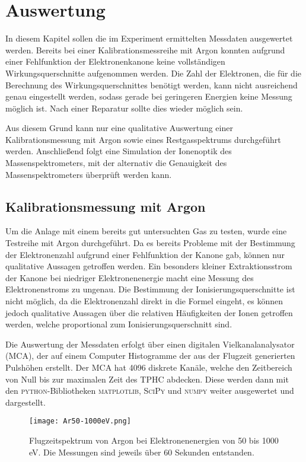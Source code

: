\chapter{Auswertung}
\label{chap:Auswertung}
In diesem Kapitel sollen die im Experiment ermittelten Messdaten ausgewertet werden. Bereits bei einer Kalibrationsmessreihe mit Argon konnten aufgrund einer Fehlfunktion der Elektronenkanone keine vollständigen Wirkungsquerschnitte aufgenommen werden. Die Zahl der Elektronen, die für die Berechnung des Wirkungsquerschnittes benötigt werden, kann nicht ausreichend genau eingestellt werden, sodass gerade bei geringeren Energien keine Messung möglich ist. Nach einer Reparatur sollte dies wieder möglich sein. 

Aus diesem Grund kann nur eine qualitative Auswertung einer Kalibrationsmessung mit Argon sowie eines Restgasspektrums durchgeführt werden. Anschließend folgt eine Simulation der Ionenoptik des Massenspektrometers, mit der alternativ die Genauigkeit des Massenspektrometers überprüft werden kann.

\section{Kalibrationsmessung mit Argon}
Um die Anlage mit einem bereits gut untersuchten Gas zu testen, wurde eine Testreihe mit Argon durchgeführt. Da es bereits Probleme mit der Bestimmung der Elektronenzahl aufgrund einer Fehlfunktion der Kanone gab, können nur qualitative Aussagen getroffen werden. Ein besonders kleiner Extraktionsstrom der Kanone bei niedriger Elektronenenergie macht eine Messung des Elektronenstroms zu ungenau. Die Bestimmung der Ionisierungsquerschnitte ist nicht möglich, da die Elektronenzahl direkt in die Formel eingeht, es können jedoch qualitative Aussagen über die relativen Häufigkeiten der Ionen getroffen werden, welche proportional zum Ionisierungsquerschnitt sind.

Die Auswertung der Messdaten erfolgt über einen digitalen Vielkanalanalysator (MCA), der auf einem Computer Histogramme der aus der Flugzeit generierten Pulshöhen erstellt. Der MCA hat 4096 diskrete Kanäle, welche den Zeitbereich von Null bis zur maximalen Zeit des TPHC abdecken. Diese werden dann mit den \textsc{python}-Bibliotheken \textsc{matplotlib}, \textsc{SciPy} und \textsc{numpy} weiter ausgewertet und dargestellt. 

\begin{figure}
    \centering
    \hspace{-1.6cm}\texttt{[image: Ar50-1000eV.png]}
    \caption[Flugzeitspektrum von Argon bei Elektronenenergien von 50 bis 1000 eV]{Flugzeitspektrum von Argon bei Elektronenenergien von 50 bis 1000 eV. Die Messungen sind jeweils über 60 Sekunden entstanden.}
    \label{fig:ar}
\end{figure}

